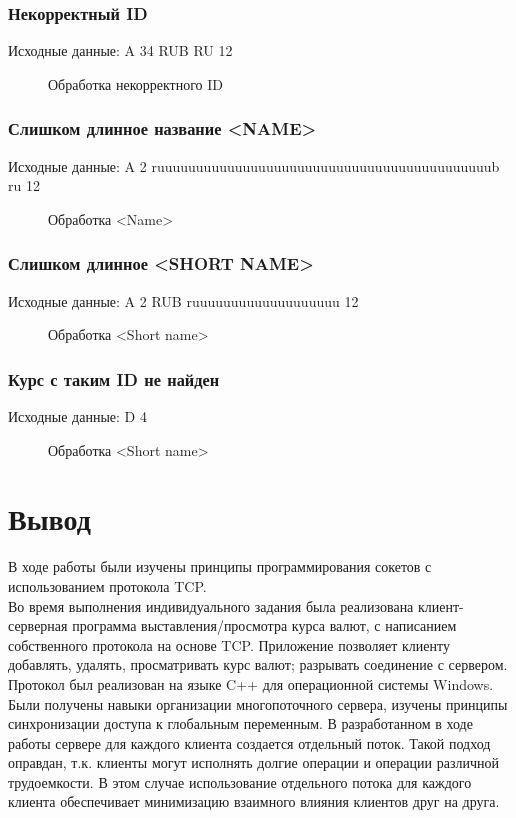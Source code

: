 \documentclass[a4paper,14pt]{article}
\begin{document}
\subsubsection {Некорректный ID}
Исходные данные: A 34 RUB RU 12
\begin{figure}[h!]
	\noindent\centering{
		\texttt{[image: 17]}}
	\caption{Обработка некорректного ID}
	\label{figCurves}
\end{figure}
\newpage
\subsubsection {Слишком длинное название <NAME>}
Исходные данные: A 2 ruuuuuuuuuuuuuuuuuuuuuuuuuuuuuuuuuuuuuuuuuuub ru 12

\begin{figure}[h!]
	\noindent\centering{
		\texttt{[image: 10]}}
	\caption{Обработка <Name>}
	\label{figCurves}
\end{figure}

\subsubsection {Слишком длинное <SHORT NAME>}
Исходные данные: A 2 RUB ruuuuuuuuuuuuuuuuuuu 12

\begin{figure}[h!]
	\noindent\centering{
		\texttt{[image: 10]}}
	\caption{Обработка <Short name>}
	\label{figCurves}
\end{figure}

\subsubsection {Курс с таким ID не найден}
Исходные данные: D 4

\begin{figure}[h!]
	\noindent\centering{
		\texttt{[image: 14]}}
	\caption{Обработка <Short name>}
	\label{figCurves}
\end{figure}
\section{Вывод}
В ходе работы были изучены принципы программирования сокетов с использованием протокола TCP.\\
Во время выполнения индивидуального задания была реализована клиент-серверная программа выставления/просмотра курса валют, с написанием собственного протокола на основе TCP. Приложение позволяет клиенту добавлять, удалять, просматривать курс валют; разрывать соединение с сервером. Протокол был реализован на языке C++ для операционной системы Windows.\\
Были получены навыки организации многопоточного сервера, изучены принципы синхронизации доступа к глобальным переменным.
В разработанном в ходе работы сервере для каждого клиента создается отдельный поток. Такой подход оправдан, т.к. клиенты могут исполнять долгие операции и операции различной трудоемкости. В этом случае использование отдельного потока для каждого клиента обеспечивает минимизацию взаимного влияния клиентов друг на друга.  \\\\
\end{document}
